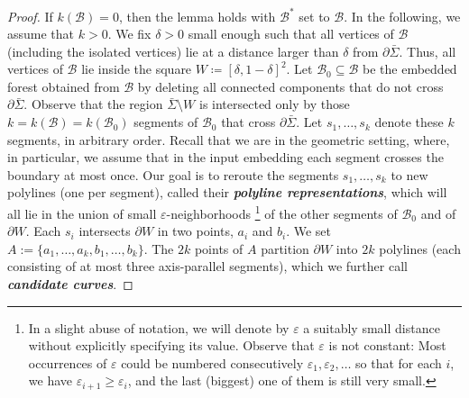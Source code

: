 \documentclass[a4paper,USenglish,cleveref,colorlinks=true,urlcolor=black,linkcolor=black,citecolor=black,thm-restate,authorcolumns]{lipics-v2021}
\theoremstyle{claimstyle}
\def\defn#1{\textit{\textbf{\boldmath #1}}}
\renewcommand{\emph}[1]{\defn{#1}}
\begin{document}
\begin{proof}
    If $k({\mathcal B})=0$, then the lemma holds with ${\mathcal B}^*$ set to $\mathcal B$.
    In the following, we assume that $k>0$.
    We fix $\delta>0$ small enough such that all vertices of $\mathcal B$ (including the isolated vertices) lie at a distance larger than $\delta$ from $\partial\bar\Sigma$.
    Thus, all vertices of $\mathcal B$ lie inside the square $W\coloneqq [\delta,1-\delta]^2$.
    Let $\mathcal B_{0}\subseteq \mathcal B$ be the embedded forest obtained from $\mathcal B$ by deleting all connected components that do not cross $\partial\bar\Sigma$.
    Observe that the region $\bar\Sigma\setminus W$ is intersected only by those $k=k({\mathcal B})=k({\mathcal B}_{0})$ segments of $\mathcal B_{0}$ that cross $\partial\bar\Sigma$. Let $s_1,\dots,s_k$ denote these $k$ segments, in arbitrary order.
    Recall that we are in the geometric setting, where, in particular, we assume that in the input embedding each segment crosses the boundary at most once.
    Our goal is to reroute the segments $s_1,\dots,s_k$ to new polylines (one per segment), called their \emph{polyline representations},
    which will all lie in the union of small $\varepsilon$-neighborhoods%
    \footnote{In a slight abuse of notation, we will denote by $\varepsilon$ a suitably small distance without explicitly specifying its value.
    Observe that $\varepsilon$ is not constant:
    Most occurrences of $\varepsilon$ could be numbered consecutively $\varepsilon_1,\varepsilon_2,\ldots$ so that for each $i$, we have $\varepsilon_{i+1} \ge \varepsilon_i$,
    and the last (biggest) one of them is still very small.}
    of the other segments of $\mathcal B_{0}$ and of $\partial W$.
    Each $s_i$ intersects $\partial W$ in two points, $a_i$ and $b_i$.
    We set $A:=\{a_1,\dots,a_k,b_1,\dots,b_k\}$.
    The $2k$ points of $A$ partition $\partial W$ into $2k$ polylines (each consisting of at most three axis-parallel segments), which we further call \emph{candidate curves}.


\end{proof}
\end{document}

